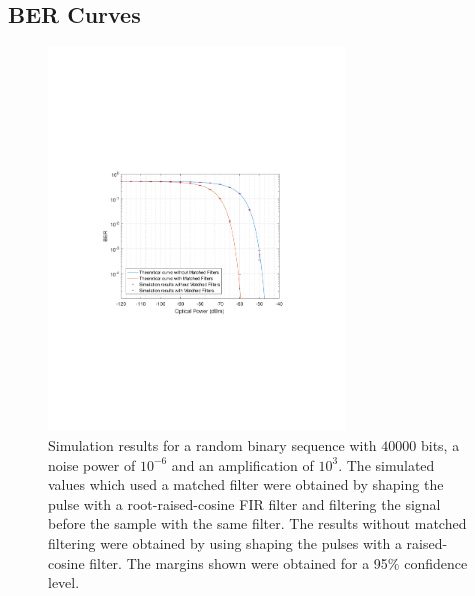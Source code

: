 \subsection{BER Curves}
\begin{figure}[H]
	\centering
	\includegraphics[clip, trim=4cm 8cm 4cm 8cm, width=0.7\textwidth]{./sdf/m_qam_system/figures/teor_vs_simul.pdf}
	\caption{Simulation results for a random binary sequence with $40000$ bits, a noise power of $10^{-6}$ and an amplification of $10^3$. The simulated values which used a matched filter were obtained by shaping the pulse with a root-raised-cosine FIR filter and filtering the signal before the sample with the same filter. The results without matched filtering were obtained by using shaping the pulses with a raised-cosine filter. The margins shown were obtained for a 95\% confidence level.}
	\label{fig:ber_pseudorandom}
\end{figure}%


